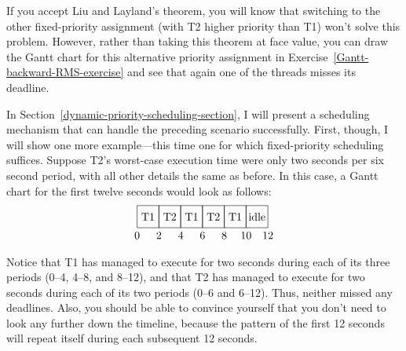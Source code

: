 If you accept Liu and Layland's theorem, you will know that switching
to the other fixed-priority assignment (with T2 higher priority than
T1) won't solve this problem.  However, rather than taking this
theorem at face value, you can draw the Gantt chart for
this alternative priority assignment in Exercise~\ref{Gantt-backward-RMS-exercise} and see that again one of the
threads misses its deadline.

In Section~\ref{dynamic-priority-scheduling-section}, I will present a scheduling mechanism
that can handle the preceding scenario successfully.
First, though, I will show one
more example---this time one for which fixed-priority scheduling
suffices.  Suppose T2's worst-case execution time were only two
seconds per six second period, with all other details the same as
before.  In this case, a Gantt chart for the first twelve seconds
would look as follows:
\[\begin{tikzpicture}[scale=.035]
\draw (0,0) rectangle (20,20);
\draw (20,0) rectangle (40,20);
\draw (40,0) rectangle (60,20);
\draw (60,0) rectangle (80,20);
\draw (80,0) rectangle (100,20);
\draw (100,0) rectangle (120,20);
\draw (10,10) node{T1};
\draw (30,10) node{T2};
\draw (50,10) node{T1};
\draw (70,10) node{T2};
\draw (90,10) node{T1};
\draw (110,10) node{idle};
\draw (0,-7) node{0};
\draw (20,-7) node{2};
\draw (40,-7) node{4};
\draw (60,-7) node{6};
\draw (80,-7) node{8};
\draw (100,-7) node{10};
\draw (120,-7) node{12};
\end{tikzpicture}\]
\iffalse
\[\begin{graph}(130,32)(-3,-12)
\graphlinecolour{0}
\fillednodesfalse
\rectnode{a}[20,20](10,10)
\rectnode{b}[20,20](30,10)
\rectnode{c}[20,20](50,10)
\rectnode{d}[20,20](70,10)
\rectnode{e}[20,20](90,10)
\rectnode{f}[20,20](110,10)
\autonodetext{a}{T1}
\autonodetext{b}{T2}
\autonodetext{c}{T1}
\autonodetext{d}{T2}
\autonodetext{e}{T1}
\autonodetext{f}{idle}
\freetext(0,-7){0}
\freetext(20,-7){2}
\freetext(40,-7){4}
\freetext(60,-7){6}
\freetext(80,-7){8}
\freetext(100,-7){10}
\freetext(120,-7){12}
\end{graph}\]
\fi
\iffalse
\begin{verbatim}
+----+----+----+----+----+----+
| T1 | T2 | T1 | T2 | T1 |idle|
+----+----+----+----+----+----+
0    2    4    6    8    10   12
\end{verbatim}
\fi
Notice that T1 has managed to execute for two seconds during each of
its three periods (0--4, 4--8, and 8--12), and that T2 has managed to
execute for two seconds during each of its two periods (0--6 and 6--12).
Thus, neither missed any deadlines.  Also, you should be able to
convince yourself that you don't need to look any further down the
timeline, because the pattern of the first 12 seconds will repeat
itself during each subsequent 12 seconds.

